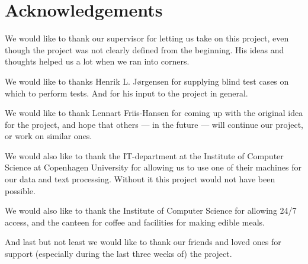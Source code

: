 \chapter*{Acknowledgements}
We would like to thank our supervisor for letting us take on this
project, even though the project was not clearly defined from the
beginning. His ideas and thoughts helped us a lot when we ran into
corners.

We would like to thanks Henrik L. J\o rgensen for supplying blind test
cases on which to perform tests. And for his input to the project in
general.

We would like to thank Lennart Friis-Hansen for coming up with the
original idea for the project, and hope that others --- in the future
--- will continue our project, or work on similar ones.

We would also like to thank the IT-department at the Institute of
Computer Science at Copenhagen University for allowing us to use one
of their machines for our data and text processing. Without it this project
would not have been possible.

We would also like to thank the Institute of Computer Science for
allowing 24/7 access, and the canteen for coffee and facilities for
making edible meals.

And last but not least we would like to thank our friends and loved
ones for support (especially during the last three weeks of) the
project.
